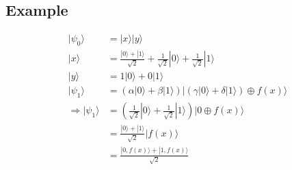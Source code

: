 \documentclass{article}
\begin{document}
\subsection{Example}
\begin{equation}
    \begin{split}
        |\psi_0\rangle & = |x\rangle|y\rangle \\
        |x\rangle & = \frac{|0\rangle + |1\rangle}{\sqrt{2}} + \frac{1}{\sqrt{2}}|0\rangle + \frac{1}{\sqrt{2}}|1\rangle \\
        |y\rangle & = 1|0\rangle + 0|1\rangle \\
        |\psi_1\rangle & = (\alpha |0\rangle + \beta |1\rangle)|(\gamma |0\rangle + \delta |1\rangle) \oplus f(x)\rangle \\
        \Longrightarrow |\psi_1\rangle & = (\frac{1}{\sqrt{2}}|0\rangle + \frac{1}{\sqrt{2}}|1\rangle)|0 \oplus f(x)\rangle \\
        & = \frac{|0\rangle + |1\rangle}{\sqrt{2}}|f(x)\rangle \\
        & = \frac{|0, f(x)\rangle + |1, f(x)\rangle}{\sqrt{2}} \\
    \end{split}
\end{equation}
\end{document}
